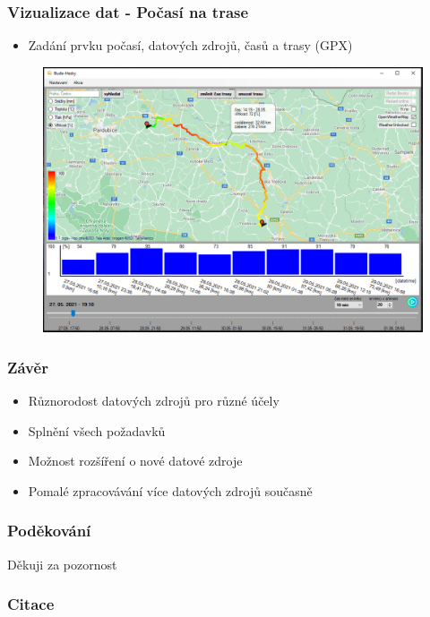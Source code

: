 \documentclass{beamer}
\begin{document}
	\begin{frame}
		\frametitle{Vizualizace dat - Počasí na trase}
		
		\begin{itemize}
			\item Zadání prvku počasí, datových zdrojů, časů a trasy (GPX)
		\end{itemize}
	
		\begin{figure}
			
			\includegraphics[scale=0.35]{figures/trasa počasí.png}
			
		\end{figure}
		
	\end{frame}

	\begin{frame}
		\frametitle{Závěr}
		
		\begin{itemize}
			\item Různorodost datových zdrojů pro různé účely
			\item Splnění všech požadavků
			\item Možnost rozšíření o nové datové zdroje
			\item Pomalé zpracovávání více datových zdrojů současně
		\end{itemize}
	\end{frame}

	\begin{frame}
		\frametitle{Poděkování}
		
		\begin{center}
			\Huge
			Děkuji za pozornost
		\end{center}
		
	\end{frame}

	\begin{frame}
		\frametitle{Citace}
		
		\nocite{*}
		
		\printbibliography
		
	\end{frame}
	
\end{document}
